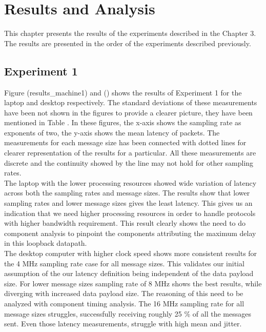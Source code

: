 \chapter{Results and Analysis}

This chapter presents the results of the experiments described in the Chapter 3.
The results are presented in the order of the experiments described previously.

\section{Experiment 1}
Figure (results\_machine1) and () shows the results of Experiment 1 for the laptop and desktop respectively.
The standard deviations of these measurements have been not shown in the figures to provide a clearer picture, they have been mentioned in Table .
In these figures, the x-axis shows the sampling rate as exponents of two, the y-axis shows the mean latency of packets.
The measurements for each message size has been connected with dotted lines for clearer representation of the results for a particular.
All these measurements are discrete and the continuity showed by the line may not hold for other sampling rates.\\

The laptop with the lower processing resources showed wide variation of latency across both the sampling rates and message sizes.
The results show that lower sampling rates and lower message sizes gives the least latency.
This gives us an indication that we need higher processing resources in order to handle protocols with higher bandwidth requirement.
This result clearly shows the need to do component analysis to pinpoint the components attributing the maximum delay in this loopback datapath.\\

The desktop computer with higher clock speed shows more consistent results for the 4 MHz sampling rate case for all message sizes.
This validates our initial assumption of the our latency definition being independent of the data payload size.
For lower message sizes sampling rate of 8 MHz shows the best results, while diverging with increased data payload size.
The reasoning of this need to be analyzed with component timing analysis.
The 16 MHz sampling rate for all message sizes struggles, successfully receiving roughly 25 \% of all the messages sent.
Even those latency measurements, struggle with high mean and jitter.\\

